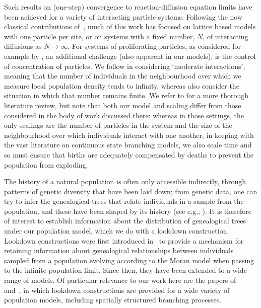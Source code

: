 \documentclass[EJP]{ejpecp} %
\newcommand{\citet}[1]{\cite{#1}}
\newcommand{\citep}[1]{\cite{#1}}
\begin{document}
Such results on (one-step) convergence to reaction-diffusion 
equation limits have been
achieved for a variety of interacting particle systems. 
Following the now classical contributions 
of~\citet{demasi/ferrari/lebowitz:1986, demasi/presutti:1991, oelschlaeger:1985},
much of this work has focused on lattice based models with one particle
per site, or on systems with a fixed number, $N$,
of interacting diffusions as $N\to\infty$.
For systems of proliferating particles,
as considered for example by 
\citet{oelschlaeger:1989, flandoli/leimbach/olivera:2019, flandoli/huang:2021}, 
an additional challenge (also apparent in our models), is 
the control of concentration of particles. 
We follow 
\citet{oelschlaeger:1989, flandoli/leimbach/olivera:2019} in considering
`moderate interactions', meaning that
the number of individuals in the neighbourhood over which we measure local
population density tends to infinity, whereas 
\citet{flandoli/huang:2021} also consider the situation in which
that number remains finite. 
We refer to \citet{flandoli/huang:2021} for a more thorough 
literature review, 
but note that both our model and scaling differ from those considered
in the body of work discussed there: whereas in those settings, the only 
scalings are the number of particles in the system and the size of the
neighbourhood over which individuals interact with one another, in
keeping with the vast literature on continuous state branching models, we 
also scale time and so must ensure that births are 
adequately compensated by deaths to prevent the population from exploding. 

The history of a natural population is often only accessible indirectly, 
through patterns of genetic diversity that have been laid down; from 
genetic data, one can try to infer the genealogical trees that relate 
individuals in a sample from the population, and these have been shaped 
by its history (see e.g., \citep{neigel1993application,kelleher2019inferring}).
It is therefore of interest to establish information about the distribution of genealogical trees 
under our population model, which we do with a lookdown construction. 
Lookdown constructions were first introduced in~\cite{donnelly/kurtz:1996} to provide 
a mechanism for retaining information about genealogical relationships between individuals
sampled from a population evolving according to the Moran model when passing to the 
infinite population limit.
Since then, they have been extended to a wide range of models. Of particular
relevance to our work here are the papers of~\cite{kurtz/rodrigues:2011} 
and~\cite{etheridge/kurtz:2019}, in which
lookdown constructions are provided for a wide variety of population models, including
spatially structured branching processes.
\end{document}
